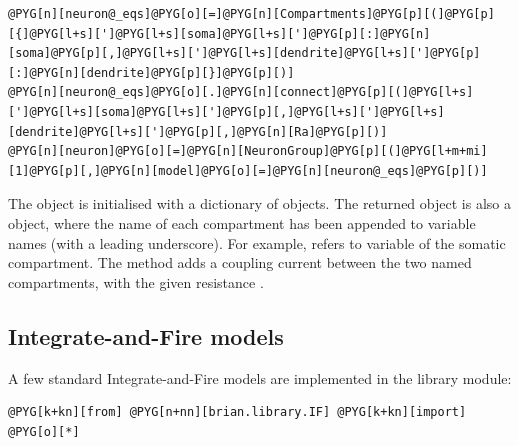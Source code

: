 \documentclass[letterpaper,10pt,english]{manual}
\begin{document}
\begin{Verbatim}[commandchars=@\[\]]
@PYG[n][neuron@_eqs]@PYG[o][=]@PYG[n][Compartments]@PYG[p][(]@PYG[p][{]@PYG[l+s][']@PYG[l+s][soma]@PYG[l+s][']@PYG[p][:]@PYG[n][soma]@PYG[p][,]@PYG[l+s][']@PYG[l+s][dendrite]@PYG[l+s][']@PYG[p][:]@PYG[n][dendrite]@PYG[p][}]@PYG[p][)]
@PYG[n][neuron@_eqs]@PYG[o][.]@PYG[n][connect]@PYG[p][(]@PYG[l+s][']@PYG[l+s][soma]@PYG[l+s][']@PYG[p][,]@PYG[l+s][']@PYG[l+s][dendrite]@PYG[l+s][']@PYG[p][,]@PYG[n][Ra]@PYG[p][)]
@PYG[n][neuron]@PYG[o][=]@PYG[n][NeuronGroup]@PYG[p][(]@PYG[l+m+mi][1]@PYG[p][,]@PYG[n][model]@PYG[o][=]@PYG[n][neuron@_eqs]@PYG[p][)]
\end{Verbatim}

The  object is initialised with a dictionary of  objects.
The returned object  is also a  object, where the name of
each compartment has been appended to variable names (with a leading underscore).
For example,  refers to variable  of the somatic compartment.
The  method adds a coupling current between the two named compartments, with the given
resistance .


\subsection{Integrate-and-Fire models}

A few standard Integrate-and-Fire models are implemented in the  library module:

\begin{Verbatim}[commandchars=@\[\]]
@PYG[k+kn][from] @PYG[n+nn][brian.library.IF] @PYG[k+kn][import] @PYG[o][*]
\end{Verbatim}
\end{document}
